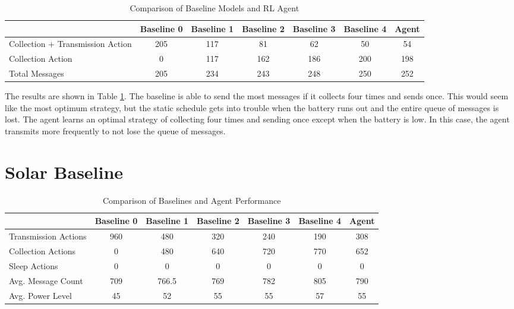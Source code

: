 \documentclass[10pt]{cai}
\begin{document}
\begin{table}[h]
  \centering
  \caption{Comparison of Baseline Models and RL Agent}
  \begin{tabular}{lcccccc}
      \toprule
      & \textbf{Baseline 0} & \textbf{Baseline 1} & \textbf{Baseline 2} & \textbf{Baseline 3} & \textbf{Baseline 4} & \textbf{Agent} \\
      \midrule
      Collection + Transmission Action & 205 & 117 & 81  & 62  & 50  & 54  \\
      Collection Action                 & 0   & 117 & 162 & 186 & 200 & 198 \\
      Total Messages                     & 205 & 234 & 243 & 248 & 250 & 252 \\
      \bottomrule
  \end{tabular}
  \label{tab:batter_drain_result}
\end{table}

The results are shown in Table \ref{tab:batter_drain_result}.
The baseline is able to send the most messages if it collects four times and sends once.
This would seem like the most optimum strategy, but the static schedule gets into trouble when the battery runs out and the entire queue of messages is lost.
The agent learns an optimal strategy of collecting four times and sending once except when the battery is low.
In this case, the agent transmits more frequently to not lose the queue of messages.

\section{Solar Baseline}
\begin{table}[h!]
  \centering
  \begin{tabular}{lcccccc}
  \hline
   & Baseline 0 & Baseline 1 & Baseline 2 & Baseline 3 & Baseline 4 & Agent \\
  \hline
  Transmission Actions & 960 & 480 & 320 & 240 & 190 & 308 \\
  Collection Actions   & 0   & 480 & 640 & 720 & 770 & 652 \\
  Sleep Actions        & 0   & 0   & 0   & 0   & 0   & 0   \\
  Avg. Message Count   & 709 & 766.5 & 769 & 782 & 805 & 790 \\
  Avg. Power Level     & 45  & 52  & 55  & 55  & 57  & 55  \\
  \hline
  \end{tabular}
  \caption{Comparison of Baselines and Agent Performance}
  \label{table:baselines_vs_agent}
  \end{table}
  

\printbibliography[heading=subbibintoc]
\end{document}
